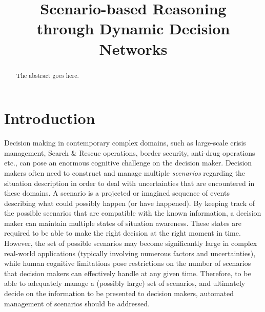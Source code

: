 \documentclass[conference]{IEEEtran}
\begin{document}
\title{Scenario-based Reasoning \\through Dynamic Decision Networks}

\author{
\and
{}
\and
{}
}


\maketitle

\begin{abstract}
The abstract goes here.
\end{abstract}

\IEEEpeerreviewmaketitle

\section{Introduction}

Decision making in contemporary complex domains, such as large-scale crisis management, Search \& Rescue operations, border security, anti-drug operations etc., can pose an enormous cognitive challenge on the decision maker. Decision makers often need to construct and manage multiple {\em scenarios} regarding the situation description in order to deal with uncertainties that are encountered in these domains. A scenario is a projected or imagined sequence of events describing what could possibly happen (or have happened). By keeping track of the possible scenarios that are compatible with the known information, a decision maker can maintain multiple states of situation awareness. These states are required to be able to make the right decision at the right moment in time. However, the set of possible scenarios may become significantly large in complex real-world applications (typically involving numerous factors and uncertainties), while human cognitive limitations pose restrictions on the number of scenarios that decision makers can effectively handle at any given time. Therefore, to be able to adequately manage a (possibly large) set of scenarios, and  ultimately decide on the information to be presented to decision makers, automated management of scenarios should be addressed.
\end{document}
